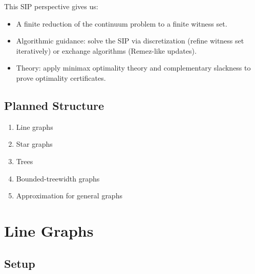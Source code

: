 \documentclass[
]{article}
\begin{document}
This SIP perspective gives us:

\begin{itemize}
\item
  A finite reduction of the continuum problem to a finite witness set.
\item
  Algorithmic guidance: solve the SIP via discretization (refine witness
  set iteratively) or exchange algorithms (Remez-like updates).
\item
  Theory: apply minimax optimality theory and complementary slackness to
  prove optimality certificates.
\end{itemize}

\subsection{Planned Structure}

\begin{enumerate}
\item
  Line graphs
\item
  Star graphs
\item
  Trees
\item
  Bounded-treewidth graphs
\item
  Approximation for general graphs
\end{enumerate}

\section{Line Graphs}

\subsection{Setup}
\end{document}
